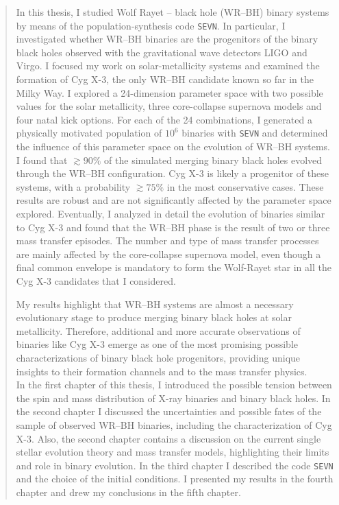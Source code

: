 \documentclass[a4paper,titlepage]{book}     	%
\newenvironment{abstract}{\newpage \thispagestyle{empty} \vspace*{3\baselineskip}
	\begin{center}\Large\textbf\abstractname\end{center}
	\begin{quotation}
	}{\end{quotation}\clearpage}
\begin{document}
\begin{abstract}
In this thesis, I studied Wolf Rayet -- black hole (WR--BH) binary systems by means of the population-synthesis code \texttt{SEVN}. In particular, I investigated whether WR--BH binaries are the progenitors of the binary black holes observed with the gravitational wave detectors LIGO and Virgo. I focused my work on solar-metallicity systems and examined the formation of Cyg X-3, the only WR--BH candidate known so far in the Milky Way. I explored a 24-dimension parameter space with two possible values for the solar metallicity, three core-collapse supernova models and four natal kick options. For each of the 24 combinations, I generated a physically motivated population of $10^6$ binaries with \texttt{SEVN} and determined the influence of this parameter space on the evolution of WR--BH systems.\\

I found that $\gtrsim 90\%$ of the simulated merging binary black holes evolved through the WR--BH configuration. Cyg X-3 is likely a progenitor of these systems, with a probability $\gtrsim 75\%$ in the most conservative cases. These results are robust and are not significantly affected by the parameter space explored. Eventually, I analyzed in detail the evolution of binaries similar to Cyg X-3 and found that the WR--BH phase is the result of two or three mass transfer episodes. The number and type of mass transfer processes are mainly affected by the core-collapse supernova model, even though a final common envelope is mandatory to form the Wolf-Rayet star in all the Cyg X-3 candidates that I considered.

My results highlight that WR--BH systems are almost a necessary evolutionary stage to produce merging binary black holes at solar metallicity. Therefore, additional and more accurate observations of binaries like Cyg X-3 emerge as one of the most promising possible characterizations of binary black hole progenitors, providing unique insights to their formation channels and to the mass transfer physics.\\

In the first chapter of this thesis, I introduced the possible tension between the spin and mass distribution of X-ray binaries and binary black holes. In the second chapter I discussed the uncertainties and possible fates of the sample of observed WR--BH binaries, including the characterization of Cyg X-3. Also, the second chapter contains a discussion on the current single stellar evolution theory and mass transfer models, highlighting their limits and role in binary evolution. In the third chapter I described the code \texttt{SEVN} and the choice of the initial conditions. I presented my results in the fourth chapter and drew my conclusions in the fifth chapter. 
\end{abstract}
\end{document}
